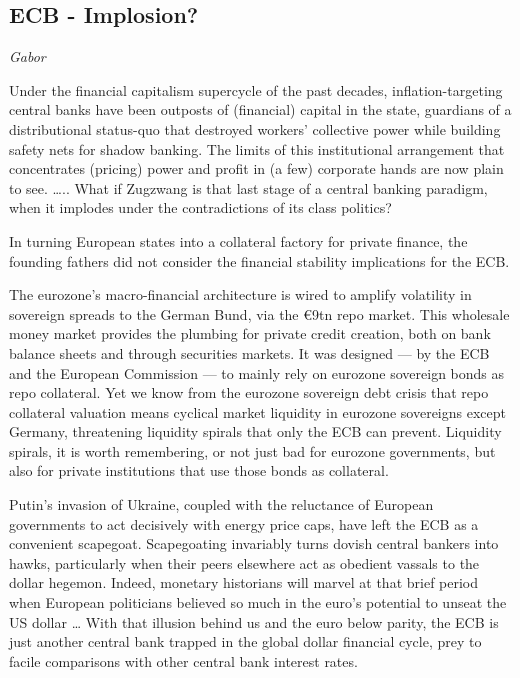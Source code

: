 \documentclass[
]{book}
\begin{document}
\hypertarget{ecb---implosion}{%
\subsection{ECB - Implosion?}\label{ecb---implosion}}

\emph{Gabor}

Under the financial capitalism supercycle of the past decades, inflation-targeting central banks have been outposts of (financial) capital in the state, guardians of a distributional status-quo that destroyed workers' collective power while building safety nets for shadow banking. The limits of this institutional arrangement that concentrates (pricing) power and profit in (a few) corporate hands are now plain to see. \ldots..
What if Zugzwang is that last stage of a central banking paradigm, when it implodes under the contradictions of its class politics?

In turning European states into a collateral factory for private finance, the founding fathers did not consider the financial stability implications for the ECB.

The eurozone's macro-financial architecture is wired to amplify volatility in sovereign spreads to the German Bund, via the €9tn repo market. This wholesale money market provides the plumbing for private credit creation, both on bank balance sheets and through securities markets. It was designed --- by the ECB and the European Commission --- to mainly rely on eurozone sovereign bonds as repo collateral. Yet we know from the eurozone sovereign debt crisis that repo collateral valuation means cyclical market liquidity in eurozone sovereigns except Germany, threatening liquidity spirals that only the ECB can prevent. Liquidity spirals, it is worth remembering, or not just bad for eurozone governments, but also for private institutions that use those bonds as collateral.

Putin's invasion of Ukraine, coupled with the reluctance of European governments to act decisively with energy price caps, have left the ECB as a convenient scapegoat. Scapegoating invariably turns dovish central bankers into hawks, particularly when their peers elsewhere act as obedient vassals to the dollar hegemon. Indeed, monetary historians will marvel at that brief period when European politicians believed so much in the euro's potential to unseat the US dollar \ldots{} With that illusion behind us and the euro below parity, the ECB is just another central bank trapped in the global dollar financial cycle, prey to facile comparisons with other central bank interest rates.
\end{document}
